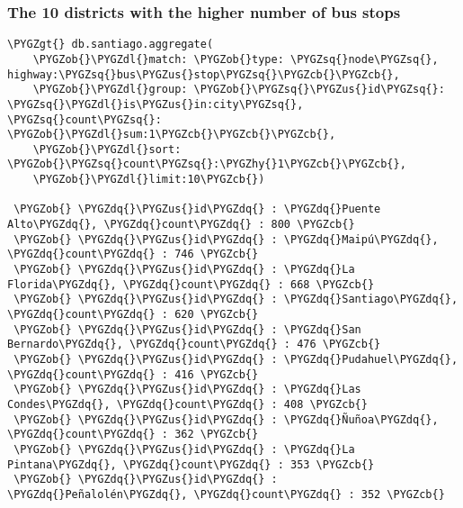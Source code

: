 \documentclass[a4paper,10pt,english]{sphinxhowto}
\def\PYGZus{\char`\_}
\def\PYGZob{\char`\{}
\def\PYGZcb{\char`\}}
\def\PYGZgt{\char`\>}
\def\PYGZdl{\char`\$}
\def\PYGZhy{\char`\-}
\def\PYGZsq{\char`\'}
\def\PYGZdq{\char`\"}
\renewcommand\PYGZsq{\textquotesingle}
\begin{document}
\subsubsection{The 10 districts with the higher number of bus stops}
\label{index:the-10-districts-with-the-higher-number-of-bus-stops}
\begin{Verbatim}[commandchars=\\\{\}]
\PYGZgt{} db.santiago.aggregate(
    \PYGZob{}\PYGZdl{}match: \PYGZob{}type: \PYGZsq{}node\PYGZsq{}, highway:\PYGZsq{}bus\PYGZus{}stop\PYGZsq{}\PYGZcb{}\PYGZcb{},
    \PYGZob{}\PYGZdl{}group: \PYGZob{}\PYGZsq{}\PYGZus{}id\PYGZsq{}: \PYGZsq{}\PYGZdl{}is\PYGZus{}in:city\PYGZsq{}, \PYGZsq{}count\PYGZsq{}: \PYGZob{}\PYGZdl{}sum:1\PYGZcb{}\PYGZcb{}\PYGZcb{},
    \PYGZob{}\PYGZdl{}sort: \PYGZob{}\PYGZsq{}count\PYGZsq{}:\PYGZhy{}1\PYGZcb{}\PYGZcb{},
    \PYGZob{}\PYGZdl{}limit:10\PYGZcb{})

 \PYGZob{} \PYGZdq{}\PYGZus{}id\PYGZdq{} : \PYGZdq{}Puente Alto\PYGZdq{}, \PYGZdq{}count\PYGZdq{} : 800 \PYGZcb{}
 \PYGZob{} \PYGZdq{}\PYGZus{}id\PYGZdq{} : \PYGZdq{}Maipú\PYGZdq{}, \PYGZdq{}count\PYGZdq{} : 746 \PYGZcb{}
 \PYGZob{} \PYGZdq{}\PYGZus{}id\PYGZdq{} : \PYGZdq{}La Florida\PYGZdq{}, \PYGZdq{}count\PYGZdq{} : 668 \PYGZcb{}
 \PYGZob{} \PYGZdq{}\PYGZus{}id\PYGZdq{} : \PYGZdq{}Santiago\PYGZdq{}, \PYGZdq{}count\PYGZdq{} : 620 \PYGZcb{}
 \PYGZob{} \PYGZdq{}\PYGZus{}id\PYGZdq{} : \PYGZdq{}San Bernardo\PYGZdq{}, \PYGZdq{}count\PYGZdq{} : 476 \PYGZcb{}
 \PYGZob{} \PYGZdq{}\PYGZus{}id\PYGZdq{} : \PYGZdq{}Pudahuel\PYGZdq{}, \PYGZdq{}count\PYGZdq{} : 416 \PYGZcb{}
 \PYGZob{} \PYGZdq{}\PYGZus{}id\PYGZdq{} : \PYGZdq{}Las Condes\PYGZdq{}, \PYGZdq{}count\PYGZdq{} : 408 \PYGZcb{}
 \PYGZob{} \PYGZdq{}\PYGZus{}id\PYGZdq{} : \PYGZdq{}Ñuñoa\PYGZdq{}, \PYGZdq{}count\PYGZdq{} : 362 \PYGZcb{}
 \PYGZob{} \PYGZdq{}\PYGZus{}id\PYGZdq{} : \PYGZdq{}La Pintana\PYGZdq{}, \PYGZdq{}count\PYGZdq{} : 353 \PYGZcb{}
 \PYGZob{} \PYGZdq{}\PYGZus{}id\PYGZdq{} : \PYGZdq{}Peñalolén\PYGZdq{}, \PYGZdq{}count\PYGZdq{} : 352 \PYGZcb{}
\end{Verbatim}



\renewcommand{\indexname}{Index}
\printindex
\end{document}
